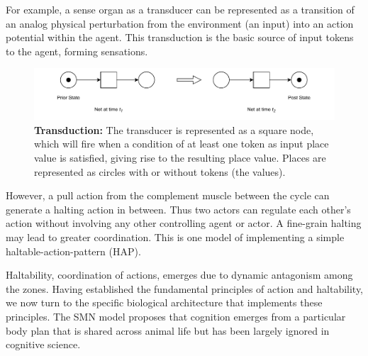 For example, a sense organ as a transducer can be represented as a transition of an analog physical perturbation from the environment (an input) into an action potential within the agent. This transduction is the basic source of input tokens to the agent, forming sensations.
\begin{figure}[ht] 
\includegraphics[width=\textwidth]{graphics/PN_Transduction.pdf}
\caption{\textbf{Transduction:
}The transducer is represented as a square node, which will fire when a condition of at least one token as input place value is satisfied, giving rise to the resulting place value.
Places are represented as circles with or without tokens (the values).}
\label{transduction}
\end{figure}

However, a pull action from the complement muscle between the cycle can generate a halting action in between.  Thus two actors can regulate each other's action without involving any other controlling agent or actor. A fine-grain halting may lead to greater coordination.  This is one model of implementing a simple haltable-action-pattern (HAP). 

Haltability, coordination of actions, emerges due to dynamic antagonism among the zones. Having established the fundamental principles of action and haltability, we now turn to the specific biological architecture that implements these principles. The SMN model proposes that cognition emerges from a particular body plan that is shared across animal life but has been largely ignored in cognitive science.
